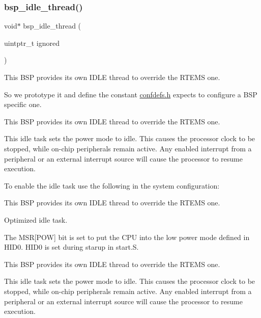 \subsubsection{\texorpdfstring{bsp\_idle\_thread()}{bsp\_idle\_thread()}}
{\footnotesize\ttfamily void$\ast$ bsp\+\_\+idle\+\_\+thread (\begin{DoxyParamCaption}\item[{uintptr\+\_\+t}]{ignored }\end{DoxyParamCaption})}



This B\+SP provides its own I\+D\+LE thread to override the R\+T\+E\+MS one. 

So we prototype it and define the constant \mbox{\hyperlink{confdefs_8h}{confdefs.\+h}} expects to configure a B\+SP specific one.

This B\+SP provides its own I\+D\+LE thread to override the R\+T\+E\+MS one.

This idle task sets the power mode to idle. This causes the processor clock to be stopped, while on-\/chip peripherals remain active. Any enabled interrupt from a peripheral or an external interrupt source will cause the processor to resume execution.

To enable the idle task use the following in the system configuration\+:


\begin{DoxyCode}{0}
\DoxyCodeLine{\textcolor{preprocessor}{\#include <bsp.h>}}
\DoxyCodeLine{}
\DoxyCodeLine{\textcolor{preprocessor}{\#define CONFIGURE\_INIT}}
\DoxyCodeLine{}
\DoxyCodeLine{\textcolor{preprocessor}{\#define CONFIGURE\_IDLE\_TASK\_BODY bsp\_idle\_thread}}
\DoxyCodeLine{}
\end{DoxyCode}


This B\+SP provides its own I\+D\+LE thread to override the R\+T\+E\+MS one.

Optimized idle task.

The M\+SR\mbox{[}P\+OW\mbox{]} bit is set to put the C\+PU into the low power mode defined in H\+I\+D0. H\+I\+D0 is set during starup in start.\+S.

This B\+SP provides its own I\+D\+LE thread to override the R\+T\+E\+MS one.

This idle task sets the power mode to idle. This causes the processor clock to be stopped, while on-\/chip peripherals remain active. Any enabled interrupt from a peripheral or an external interrupt source will cause the processor to resume execution.

